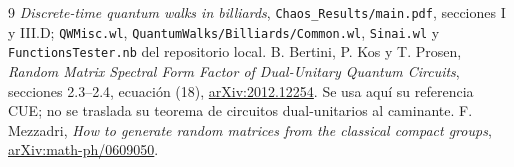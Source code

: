 \documentclass[11pt]{article}
\begin{document}
\begin{thebibliography}{9}
 \emph{Discrete-time quantum walks in billiards},
\texttt{Chaos\_Results/main.pdf}, secciones I y III.D;
\texttt{QWMisc.wl}, \texttt{QuantumWalks/Billiards/Common.wl},
\texttt{Sinai.wl} y \texttt{FunctionsTester.nb} del repositorio local.
 B. Bertini, P. Kos y T. Prosen,
\emph{Random Matrix Spectral Form Factor of Dual-Unitary Quantum Circuits},
secciones 2.3--2.4, ecuación (18),
\href{https://arxiv.org/abs/2012.12254}{arXiv:2012.12254}.
Se usa aquí su referencia CUE; no se traslada su teorema de circuitos
dual-unitarios al caminante.
 F. Mezzadri,
\emph{How to generate random matrices from the classical compact groups},
\href{https://arxiv.org/abs/math-ph/0609050}{arXiv:math-ph/0609050}.
\end{thebibliography}
\end{document}
